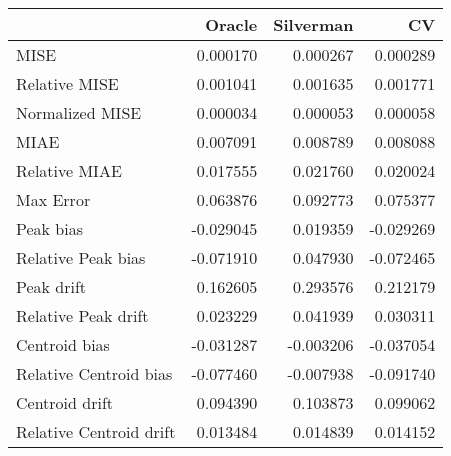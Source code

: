 \begin{tabular}{lrrr}
  \hline
 & Oracle & Silverman & CV \\ 
  \hline
MISE & 0.000170 & 0.000267 & 0.000289 \\ 
  Relative MISE & 0.001041 & 0.001635 & 0.001771 \\ 
  Normalized MISE & 0.000034 & 0.000053 & 0.000058 \\ 
  MIAE & 0.007091 & 0.008789 & 0.008088 \\ 
  Relative MIAE & 0.017555 & 0.021760 & 0.020024 \\ 
  Max Error & 0.063876 & 0.092773 & 0.075377 \\ 
  Peak bias & -0.029045 & 0.019359 & -0.029269 \\ 
  Relative Peak bias & -0.071910 & 0.047930 & -0.072465 \\ 
  Peak drift & 0.162605 & 0.293576 & 0.212179 \\ 
  Relative Peak drift & 0.023229 & 0.041939 & 0.030311 \\ 
  Centroid bias & -0.031287 & -0.003206 & -0.037054 \\ 
  Relative Centroid bias & -0.077460 & -0.007938 & -0.091740 \\ 
  Centroid drift & 0.094390 & 0.103873 & 0.099062 \\ 
  Relative Centroid drift & 0.013484 & 0.014839 & 0.014152 \\ 
   \hline
\end{tabular}
